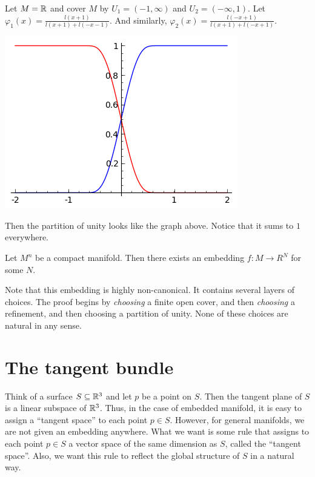 \documentclass[11pt, english]{article}
\begin{document}
\begin{example}
Let $M= \mathbb{R}$ and cover $M$ by $U_1=(-1,\infty)$ and $U_2=(-\infty,1)$. Let $\varphi_1(x) = \frac{l(x+1)}{l(x+1)+l(-x-1)}$. And similarly, $\varphi_2(x) = \frac{l(-x+1)}{l(x+1)+l(-x+1)}$.
\begin{center}
\includegraphics{partition}
\end{center}
Then the partition of unity looks like the graph above. Notice that it sums to $1$ everywhere.
\end{example}

\begin{thm}
  Let $M^n$ be a compact manifold. Then there exists an embedding $f:M \to R^N$ for some $N$.
\end{thm}
\begin{remark}
Note that this embedding is highly non-canonical. It contains several layers of choices. The proof begins by \emph{choosing} a finite open cover, and then \emph{choosing} a refinement, and then choosing a partition of unity. None of these choices are natural in any sense.
\end{remark} 


\newpage
\section{The tangent bundle}

Think of a surface $S \subseteq \mathbb{R}^3$ and let $p$ be a point on $S$. Then the tangent plane of $S$ is a linear subspace of $\mathbb{R}^3$. Thus, in the case of embedded manifold, it is easy to assign a ``tangent space'' to each point $p \in S$. However, for general manifolds, we are not given an embedding anywhere. What we want is some rule that assigns to each point $p \in S$ a vector space of the same dimension as $S$, called the ``tangent space''. Also, we want this rule to reflect the global structure of $S$ in a natural way.
\end{document}
